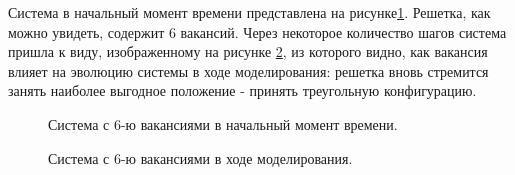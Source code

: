 \documentclass[14pt,a4paper,report]{ncc}
\begin{document}
Система в начальный момент времени представлена на рисунке\ref{ris:image1}. Решетка, как можно увидеть, содержит 6 вакансий. Через некоторое количество шагов система пришла к виду, изображенному на рисунке \ref{ris:image2}, из которого видно, как вакансия влияет на эволюцию системы в ходе моделирования: решетка вновь стремится занять наиболее выгодное положение - принять треугольную конфигурацию. 
\begin{figure}[h]
\caption{Система с 6-ю вакансиями в начальный момент времени.}
\label{ris:image1}
\end{figure}
\begin{figure}[h]
\caption{Система с 6-ю вакансиями в ходе моделирования.}
\label{ris:image2}
\end{figure}
\
\end{document}
